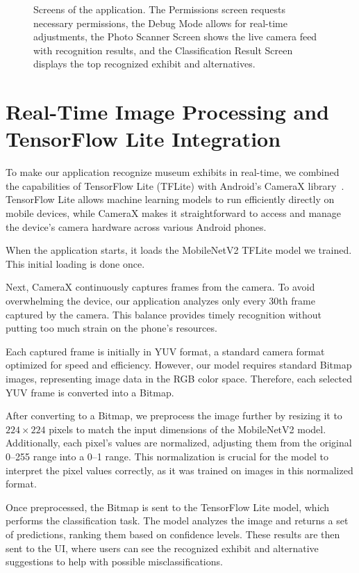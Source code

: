 \begin{figure}[h]
    \caption{Screens of the application. The Permissions screen requests necessary permissions, the Debug Mode allows for real-time adjustments, the Photo Scanner Screen shows the live camera feed with recognition results, and the Classification Result Screen displays the top recognized exhibit and alternatives.}\label{fig:app_screens_2}
\end{figure}

\section{Real-Time Image Processing and TensorFlow Lite Integration}

To make our application recognize museum exhibits in real-time, we combined the capabilities of TensorFlow Lite (TFLite) with Android's CameraX library~\cite{camerax}. TensorFlow Lite allows machine learning models to run efficiently directly on mobile devices, while CameraX makes it straightforward to access and manage the device's camera hardware across various Android phones.

When the application starts, it loads the MobileNetV2 TFLite model we trained. This initial loading is done once.

Next, CameraX continuously captures frames from the camera. To avoid overwhelming the device, our application analyzes only every 30th frame captured by the camera. This balance provides timely recognition without putting too much strain on the phone's resources.

Each captured frame is initially in YUV format, a standard camera format optimized for speed and efficiency. However, our model requires standard Bitmap images, representing image data in the RGB color space. Therefore, each selected YUV frame is converted into a Bitmap.

After converting to a Bitmap, we preprocess the image further by resizing it to $224 \times 224$ pixels to match the input dimensions of the MobileNetV2 model. Additionally, each pixel's values are normalized, adjusting them from the original 0--255 range into a 0--1 range. This normalization is crucial for the model to interpret the pixel values correctly, as it was trained on images in this normalized format.

Once preprocessed, the Bitmap is sent to the TensorFlow Lite model, which performs the classification task. The model analyzes the image and returns a set of predictions, ranking them based on confidence levels. These results are then sent to the UI, where users can see the recognized exhibit and alternative suggestions to help with possible misclassifications.

